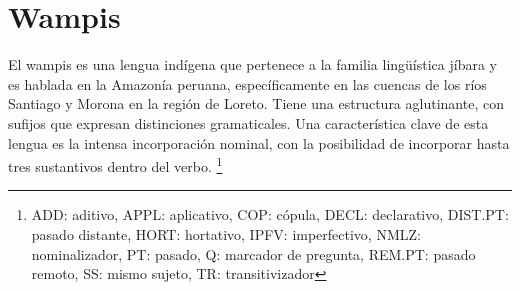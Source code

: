 \section*{Wampis}

\noindent El wampis es una lengua indígena que pertenece a la familia lingüística jíbara y es hablada en la Amazonía peruana, específicamente en las cuencas de los ríos Santiago y Morona en la región de Loreto. Tiene una estructura aglutinante, con sufijos que expresan distinciones gramaticales. Una característica clave de esta lengua es la intensa incorporación nominal, con la posibilidad de incorporar hasta tres sustantivos dentro del verbo. 
\footnote{ADD: aditivo, APPL: aplicativo, COP: cópula, DECL: declarativo, DIST.PT: pasado distante, HORT: hortativo, IPFV: imperfectivo, NMLZ: nominalizador, PT: pasado, Q: marcador de pregunta, REM.PT: pasado remoto, SS: mismo sujeto, TR: transitivizador}
\vspace{0.5cm}

